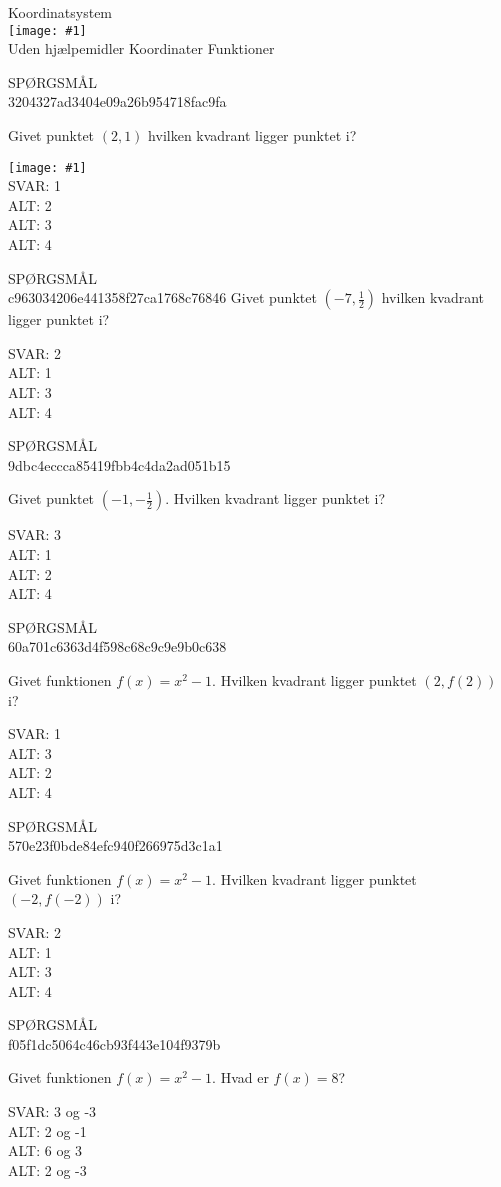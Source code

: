 \documentclass[]{article}
\newenvironment{question}[2]{SPØRGSMÅL\\}{\hspace{50px}}
\newcommand{\name}[1]{{\huge #1}\\}
\newcommand{\tag}[1]{#1}
\newcommand{\cover}[1]{\texttt{[image: \#1]}\\}
\newcommand{\image}[1]{\texttt{[image: \#1]}\\}
\newcommand{\answer}[1]{{\color{green} SVAR: #1}\\}
\newcommand{\alt}[1]{{\color{red} ALT: #1}\\}
\begin{document}
\name{Koordinatsystem}
\cover{koordinatsystem.png}
\tag{Uden hjælpemidler}
\tag{Koordinater}
\tag{Funktioner}

\begin{question}{multi}\id{3204327ad3404e09a26b954718fac9fa}

Givet punktet $(2,1)$ hvilken kvadrant ligger punktet i?

\image{quadrant.jpg}

\answer{1}
\alt{2}
\alt{3}
\alt{4}

\end{question}

\begin{question}{multi}\id{c963034206e441358f27ca1768c76846}
Givet punktet $(-7,\frac{1}{2})$ hvilken kvadrant ligger punktet i?

\answer{2}
\alt{1}
\alt{3}
\alt{4}

\end{question}

\begin{question}{multi}\id{9dbc4eccca85419fbb4c4da2ad051b15}
    
Givet punktet $(-1,-\frac{1}{2})$. Hvilken kvadrant ligger punktet i?
    
\answer{3}
\alt{1}
\alt{2}
\alt{4}

\end{question}

\begin{question}{multi}\id{60a701c6363d4f598c68c9c9e9b0c638}
    
    Givet funktionen $f(x)=x^2 - 1$. Hvilken kvadrant ligger punktet $(2, f(2))$ i?

    \answer{1}
    \alt{3}
    \alt{2}
    \alt{4}
    
\end{question}

\begin{question}{multi}\id{570e23f0bde84efc940f266975d3c1a1}
    
    Givet funktionen $f(x)=x^2 - 1$. Hvilken kvadrant ligger punktet $(-2, f(-2))$ i?

    \answer{2}
    \alt{1}
    \alt{3}
    \alt{4}
    
\end{question}

\begin{question}{multi}\id{f05f1dc5064c46cb93f443e104f9379b}
    
    Givet funktionen $f(x)=x^2 - 1$. Hvad er $f(x)=8$?

    \answer{3 og -3}
    \alt{2 og -1}
    \alt{6 og 3}
    \alt{2 og -3}

\end{question}
\end{document}
